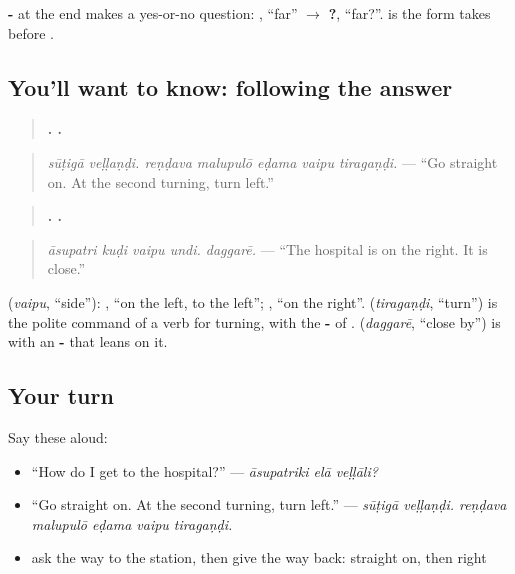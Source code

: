\textbf{-} at the end makes a yes-or-no question: \textbf{}, \textquotedblleft{}far\textquotedblright{} $\to$ \textbf{?}, \textquotedblleft{}far?\textquotedblright{}. \textbf{} is the form \textbf{} takes before \textbf{}.

\subsection*{You'll want to know: following the answer}
\begin{quote}
\textbf{ .     .}
\end{quote}

\begin{quote}
\emph{sūṭigā veḷḷaṇḍi. reṇḍava malupulō eḍama vaipu tiragaṇḍi.} — \textquotedblleft{}Go straight on. At the second turning, turn left.\textquotedblright{}
\end{quote}

\begin{quote}
\textbf{   . .}
\end{quote}

\begin{quote}
\emph{āsupatri kuḍi vaipu undi. daggarē.} — \textquotedblleft{}The hospital is on the right. It is close.\textquotedblright{}
\end{quote}

\textbf{} (\emph{vaipu}, \textquotedblleft{}side\textquotedblright{}): \textbf{ }, \textquotedblleft{}on the left, to the left\textquotedblright{}; \textbf{ }, \textquotedblleft{}on the right\textquotedblright{}. \textbf{} (\emph{tiragaṇḍi}, \textquotedblleft{}turn\textquotedblright{}) is the polite command of a verb for turning, with the \textbf{-} of \textbf{}. \textbf{} (\emph{daggarē}, \textquotedblleft{}close by\textquotedblright{}) is \textbf{} with an \textbf{-} that leans on it.

\subsection*{Your turn}
Say these aloud:

\begin{itemize}
\raggedright
  \item \textquotedblleft{}How do I get to the hospital?\textquotedblright{} — \emph{āsupatriki elā veḷḷāli?}
  \item \textquotedblleft{}Go straight on. At the second turning, turn left.\textquotedblright{} — \emph{sūṭigā veḷḷaṇḍi. reṇḍava malupulō eḍama vaipu tiragaṇḍi.}
  \item ask the way to the station, then give the way back: straight on, then right
\end{itemize}

